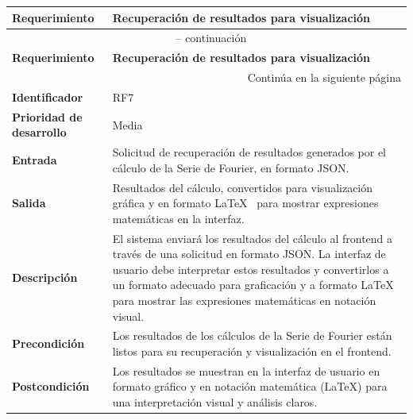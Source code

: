\begin{longtable}{|m{3.5cm}|m{9.5cm}|}
	\hline
	\rowcolor{black!75} \color{white}\textbf{Requerimiento} & \color{white}\textbf{Recuperación de resultados para visualización} \\
	\hline
	\endfirsthead
	\multicolumn{2}{c}{{\tablename\ \thetable{} -- continuación}} \\
	\hline
	\rowcolor{black!75} \color{white}\textbf{Requerimiento} & \color{white}\textbf{Recuperación de resultados para visualización} \\
	\hline
	\endhead
	\hline \multicolumn{2}{r}{{Continúa en la siguiente página}} \\
	\endfoot
	\hline
	\endlastfoot
	
	\textbf{Identificador} & RF7 \\
	\hline
	\textbf{Prioridad de desarrollo} & Media \\
	\hline
	\textbf{Entrada} & Solicitud de recuperación de resultados generados por el cálculo de la Serie de Fourier, en formato JSON. \\
	\hline
	\textbf{Salida} & Resultados del cálculo, convertidos para visualización gráfica y en formato \LaTeX~ para mostrar expresiones matemáticas en la interfaz. \\
	\hline
	\textbf{Descripción} & El sistema enviará los resultados del cálculo al frontend a través de una solicitud en formato JSON. La interfaz de usuario debe interpretar estos resultados y convertirlos a un formato adecuado para graficación y a formato \LaTeX~ para mostrar las expresiones matemáticas en notación visual. \\
	\hline
	\textbf{Precondición} & Los resultados de los cálculos de la Serie de Fourier están listos para su recuperación y visualización en el frontend. \\
	\hline
	\textbf{Postcondición} & Los resultados se muestran en la interfaz de usuario en formato gráfico y en notación matemática (\LaTeX) para una interpretación visual y análisis claros. \\
	\hline
\end{longtable}
\caption{Requerimiento funcional No. 7} \label{tabla:RF7}
\vspace{0.5cm}

